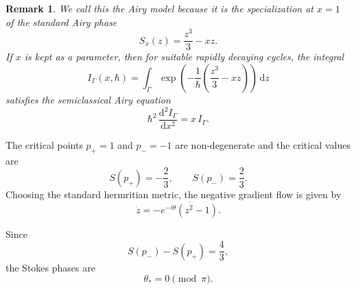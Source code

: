 \documentclass[11pt]{amsart}
\theoremstyle{plain}
\newtheorem{rmk}[thm]{Remark}
\newcommand{\dd}{\mathrm d}
\begin{document}
\begin{rmk}
We call this the Airy model because it is the specialization at \(x=1\) of
the standard Airy phase
\[
S_x(z)=\frac{z^3}{3}-xz.
\]
If \(x\) is kept as a parameter, then for suitable rapidly decaying cycles, the integral
\[
I_\Gamma(x,\hbar)
=
\int_\Gamma
\exp\left(-\frac{1}{\hbar}\left(\frac{z^3}{3}-xz\right)\right)\,\dd z
\]
satisfies the semiclassical Airy equation
\[
\hbar^2\,\frac{\dd^2 I_\Gamma}{\dd x^2}=x\,I_\Gamma.
\]
\end{rmk}

The critical points
$p_+=1$ and $p_-=-1$ are non-degenerate and the critical values are
\begin{equation*}
S(p_+)=-\frac23,
\qquad
S(p_-)=\frac23.
\end{equation*}
Choosing the standard hermritian metric, the negative gradient flow is given by
\begin{equation}\label{eq:airy-flow-complex}
\dot{z}=-\overline{e^{-i\theta}(z^2-1)}.
\end{equation}

Since
\begin{equation*}
S(p_-)-S(p_+)=\frac43,
\end{equation*}
the Stokes  phases are
\begin{equation*}
\theta_*=0\pmod\pi.
\end{equation*}

\smallskip
\end{document}
